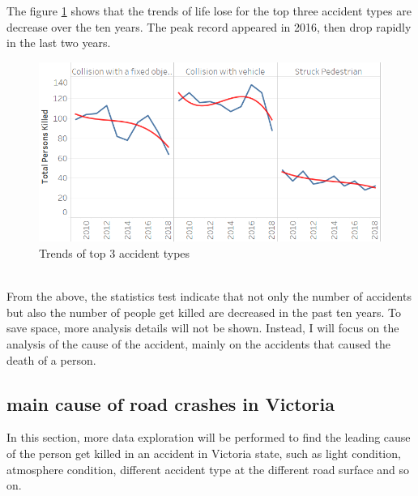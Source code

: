 \documentclass[10pt]{article}
\theoremstyle{definition}
\begin{document}
\begin{minipage}{\linewidth}
  	\centering
  	\begin{minipage}{0.3\linewidth}
	The figure \ref{fig:accidentTypeTrend} shows that the trends of life lose for the top three accident types are decrease over the ten years. The peak record appeared in 2016, then drop rapidly in the last two years.
  \end{minipage}
  \hspace{0.01\linewidth}
  \begin{minipage}{0.66\linewidth}
     \begin{figure}[H]
              \includegraphics[width=\linewidth]{images/accidentTypeTrend.png}
              \caption{Trends of top 3 accident types}
              \label{fig:accidentTypeTrend}
    \end{figure}
    \end{minipage}
\end{minipage}
\vspace{12pt}\\
From the above, the statistics test indicate that not only the number of accidents but also the number of people get killed are decreased in the past ten years. To save space, more analysis details will not be shown. Instead, I will focus on the analysis of the cause of the accident, mainly on the accidents that caused the death of a person.

\subsection{main cause of road crashes in Victoria}
\label{main_cause}
In this section, more data exploration will be performed to find the leading cause of the person get killed in an accident in Victoria state, such as light condition, atmosphere condition, different accident type at the different road surface and so on. \par
\end{document}
